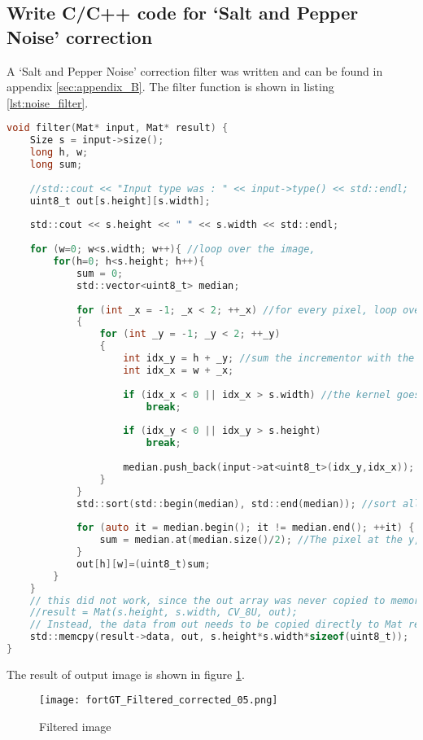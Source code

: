 \subsection{Write C/C++ code for ‘Salt and Pepper Noise’ correction}

A ‘Salt and Pepper Noise’ correction filter was written and can be found in appendix \ref{sec:appendix_B}. The filter function is shown in listing \ref{lst:noise_filter}.

\begin{lstlisting}[language=C, caption=Noise correction filter, label=lst:noise_filter]
void filter(Mat* input, Mat* result) {
    Size s = input->size();
    long h, w;
    long sum;
    
    //std::cout << "Input type was : " << input->type() << std::endl;
    uint8_t out[s.height][s.width];
    
    std::cout << s.height << " " << s.width << std::endl;
    
    for (w=0; w<s.width; w++){ //loop over the image, 
        for(h=0; h<s.height; h++){
            sum = 0;
            std::vector<uint8_t> median;
            
            for (int _x = -1; _x < 2; ++_x) //for every pixel, loop over every pixel in a 3x3 kernel
            {
                for (int _y = -1; _y < 2; ++_y)
                {
                    int idx_y = h + _y; //sum the incrementor with the kernel's, so we can identify borders
                    int idx_x = w + _x;
                    
                    if (idx_x < 0 || idx_x > s.width) //the kernel goes outside of the image, therefore break and ignore that pixel.
                        break;
                        
                    if (idx_y < 0 || idx_y > s.height)
                        break;
                    
                    median.push_back(input->at<uint8_t>(idx_y,idx_x)); // Add all the pixels from the kernel into a vector
                }
            }
            std::sort(std::begin(median), std::end(median)); //sort all pixel values from high to low
                    
            for (auto it = median.begin(); it != median.end(); ++it) {
                sum = median.at(median.size()/2); //The pixel at the y,x coordinate is now the median from our 3x3 sliding window
            }
            out[h][w]=(uint8_t)sum;
        }
    }
    // this did not work, since the out array was never copied to memory, causing image data pointing to nowhere!
    //result = Mat(s.height, s.width, CV_8U, out); 
    // Instead, the data from out needs to be copied directly to Mat result with the correct size
    std::memcpy(result->data, out, s.height*s.width*sizeof(uint8_t));
}
\end{lstlisting}


The result of output image is shown in figure \ref{fig:fortGT_Noise_Filtered}.

\begin{figure}[h!]
    \centering
    \texttt{[image: fortGT\_Filtered\_corrected\_05.png]}
    \caption{Filtered image}
    \label{fig:fortGT_Noise_Filtered}
\end{figure}